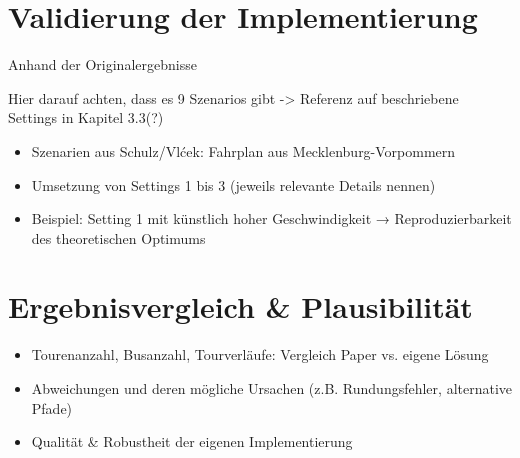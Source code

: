 \section{Validierung der Implementierung} 

Anhand der Originalergebnisse

Hier darauf achten, dass es 9 Szenarios gibt -> Referenz auf beschriebene Settings in Kapitel 3.3(?)

\begin{itemize}
    \item Szenarien aus Schulz/Vlćek: Fahrplan aus Mecklenburg-Vorpommern
    \item Umsetzung von Settings 1 bis 3 (jeweils relevante Details nennen)
    \item Beispiel: Setting 1 mit künstlich hoher Geschwindigkeit → Reproduzierbarkeit des theoretischen Optimums
\end{itemize}
\section{Ergebnisvergleich \& Plausibilität}
\begin{itemize}
\item Tourenanzahl, Busanzahl, Tourverläufe: Vergleich Paper vs. eigene Lösung
\item Abweichungen und deren mögliche Ursachen (z.B. Rundungsfehler, alternative Pfade)
\item Qualität \& Robustheit der eigenen Implementierung
\end{itemize}

